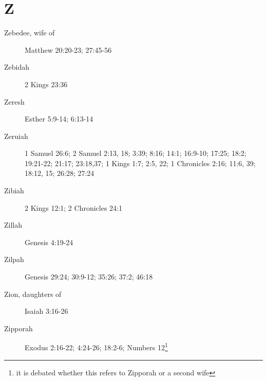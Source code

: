 \documentclass[12pt,letter,twoside,openany]{extbook}
\begin{document}
\chapter*{Z}
\begin{description}
	\item [Zebedee, wife of] Matthew 20:20-23; 27:45-56
	\item [Zebidah] 2 Kings 23:36
	\item [Zeresh] Esther 5:9-14; 6:13-14
	\item [Zeruiah] 1 Samuel 26:6; 2 Samuel 2:13, 18; 3:39; 8:16; 14:1; 16:9-10; 17:25; 18:2; 19:21-22; 21:17; 23:18,37; 1 Kings 1:7; 2:5, 22; 1 Chronicles 2:16; 11:6, 39; 18:12, 15; 26:28; 27:24 
	\item [Zibiah] 2 Kings 12:1; 2 Chronicles 24:1
	\item [Zillah] Genesis 4:19-24
	\item [Zilpah] Genesis 29:24; 30:9-12; 35:26; 37:2; 46:18
	\item [Zion, daughters of] Isaiah 3:16-26
	\item [Zipporah] Exodus 2:16-22; 4:24-26; 18:2-6; Numbers 12\footnote{it is debated whether this refers to Zipporah or a second wife}
\end{description}
\end{document}

